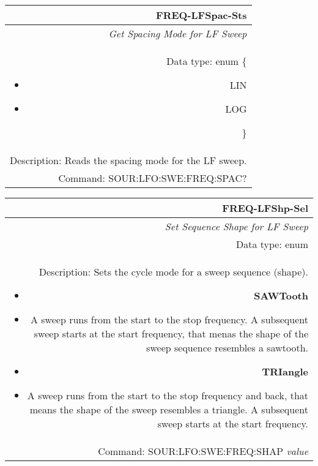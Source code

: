 \documentclass[openany]{article}
\begin{document}
		\begin{tabular}{N}
			\hline
			\bfseries FREQ-LFSpac-Sts \\ \hline
			\emph{Get Spacing Mode for LF Sweep} \\
			Data type: enum \{\begin{itemize}[noitemsep]
				\small
				\item[] LIN
				\item[] LOG
			\end{itemize}\} \\ 
			Description: Reads the spacing mode for the LF sweep. \\
			Command: SOUR:LFO:SWE:FREQ:SPAC? \\

		\end{tabular}
%
		\begin{tabular}{N}
			\hline
			\bfseries FREQ-LFShp-Sel \\ \hline
			\emph{Set Sequence Shape for LF Sweep} \\
			Data type: enum \\ 
			Description: Sets the cycle mode for a sweep sequence (shape).\begin{itemize}[noitemsep]
				\small
				\item[] \textbf{SAWTooth} 
				\item[]	A sweep runs from the start to the stop frequency. A subsequent sweep starts at the start frequency, that menas the shape of the sweep sequence resembles a sawtooth.
				\item[] \textbf{TRIangle}
				\item[] A sweep runs from the start to the stop frequency and back, that means the shape of the sweep resembles a triangle. A subsequent sweep starts at the start frequency.
			\end{itemize} \\
			Command: SOUR:LFO:SWE:FREQ:SHAP \emph{value} \\

		\end{tabular}
\end{document}
